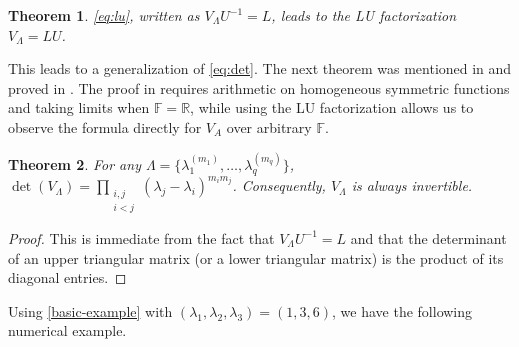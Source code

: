 \documentclass{article}
\newtheorem{theorem}{Theorem}[section]
\theoremstyle{definition}
\begin{document}
\begin{theorem}
\cref{eq:lu}, written as $V_\Lambda U^{-1} = L$,  leads to the LU factorization $V_\Lambda = LU$.
\end{theorem}

This leads to a generalization of \cref{eq:det}.  The next theorem was mentioned in \cite{AT32} and proved in \cite{Aitken39}.  The proof in \cite{Aitken39} requires arithmetic on homogeneous symmetric functions and taking limits when $\mathbb{F} = \mathbb{R}$, while using the LU factorization allows us to observe the formula directly for $V_A$ over arbitrary $\mathbb{F}$.

\begin{theorem}
\label{thm:det}
For any $\Lambda = \{\lambda_1^{(m_1)}, \ldots, \lambda_q^{(m_q)}\}$, $\det(V_\Lambda) = \prod_{\substack{i,j\\i<j}} (\lambda_j - \lambda_i)^{m_im_j}$.
Consequently, $V_\Lambda$ is always invertible.
\end{theorem}
\begin{proof}
This is immediate from the fact that $V_\Lambda U^{-1} = L$ and that the determinant of an upper triangular matrix (or a lower triangular matrix) is the product of its diagonal entries.
\end{proof}

Using \cref{basic-example} with $(\lambda_1,\lambda_2,\lambda_3) = (1,3,6)$, we have the following numerical example. 
\end{document}
